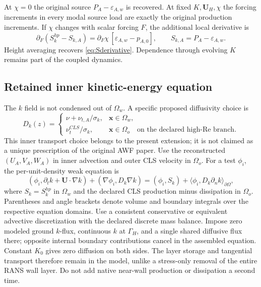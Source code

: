 \documentclass[11pt,a4paper]{article}
\numberwithin{equation}{section}
\newcommand{\eps}{\varepsilon}
\newcommand{\EAw}{\eps_{A,w}}
\begin{document}
At $\chi=0$ the original source $P_A-\EAw$ is recovered. At fixed
$K,\bm U_H,\chi$ the forcing increments in every modal source load
are exactly the original production increments. If $\chi$ changes
with scalar forcing $F$, the additional local derivative is
\begin{equation}
 \partial_F(S_k^{hp}-S_{k,A})
 =\partial_F\chi\,[\EAw-p_{A,0}],
 \qquad S_{k,A}=P_A-\EAw.
 \label{eq:hp-source-response}
\end{equation}
Height averaging recovers \cref{eq:Sderivative}. Dependence through
evolving $K$ remains part of the coupled dynamics.

\subsection{Retained inner kinetic-energy equation}
The $k$ field is not condensed out of $\Omega_w$. A specific proposed
diffusivity choice is
\begin{equation}
 D_k(z)=
 \begin{cases}
 \nu+\nu_{t,A}/\sigma_k,&\bm x\in\Omega_w,\\
 \nu_t^{CLS}/\sigma_k,&\bm x\in\Omega_o
 \quad\text{on the declared high-Re branch}.
 \end{cases}
 \label{eq:hp-kdiff}
\end{equation}
This inner transport choice belongs to the present extension; it is
not claimed as a unique prescription of the original AWF paper.
Use the reconstructed $(U_A,V_A,W_A)$ in inner advection and outer
CLS velocity in $\Omega_o$. For a test $\phi_i$, the per-unit-density
weak equation is
\begin{equation}
 (\phi_i,\partial_t k+\bm U\cdot\nabla k)
 +(\nabla\phi_i,D_k\nabla k)
 =(\phi_i,S_k)+\langle\phi_i,D_k\partial_n k\rangle_{\partial\Omega},
 \label{eq:hp-kweak}
\end{equation}
where $S_k=S_k^{hp}$ in $\Omega_w$ and the declared CLS production
minus dissipation in $\Omega_o$. Parentheses and angle brackets denote
volume and boundary integrals over the respective equation domains.
Use a consistent conservative or equivalent advective discretization
with the declared discrete mass balance. Impose zero modeled ground
$k$-flux, continuous $k$ at $\Gamma_H$, and a single shared diffusive
flux there; opposite internal boundary contributions cancel in the
assembled equation. Constant $K_0$ gives zero diffusion on both sides.
The layer storage and tangential transport therefore remain in the
model, unlike a stress-only removal of the entire RANS wall layer.
Do not add native near-wall production or dissipation a second time.
\end{document}
